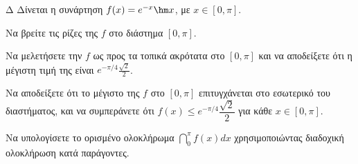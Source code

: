 \begin{thema}{Δ}
Δίνεται η συνάρτηση $f(x) = e^{-x} \hm x$, με $x \in [0, \pi]$.
\begin{erwthma}
    \item Να βρείτε τις ρίζες της $f$ στο διάστημα $[0, \pi]$.
    \item Να μελετήσετε την $f$ ως προς τα τοπικά ακρότατα στο $[0, \pi]$ και να αποδείξετε ότι η μέγιστη τιμή της είναι $e^{-\pi/4} \frac{\sqrt{2}}{2}$.
    \item Να αποδείξετε ότι το μέγιστο της $f$ στο $[0, \pi]$ επιτυγχάνεται στο εσωτερικό του διαστήματος, και να συμπεράνετε ότι $f(x) \leq e^{-\pi/4}\dfrac{\sqrt{2}}{2}$ για κάθε $x \in [0, \pi]$.
    \item Να υπολογίσετε το ορισμένο ολοκλήρωμα $\dint_0^\pi f(x) dx$ χρησιμοποιώντας διαδοχική ολοκλήρωση κατά παράγοντες.
\end{erwthma}
\end{thema}
